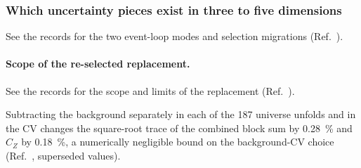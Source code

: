 \subsubsection{Which uncertainty pieces exist in three to five dimensions}
\label{sec:uq-higherdim}
See the records for the two event-loop modes and selection migrations (Ref.~\cite{NoteRecords2026}).

\paragraph{Scope of the re-selected replacement.} See the records for the scope and limits of the replacement (Ref.~\cite{NoteRecords2026}).

Subtracting the background separately in each of the 187 universe unfolds and in the CV changes the square-root trace of the combined block sum by \SI{0.28}{\percent} and $C_Z$ by \SI{0.18}{\percent}, a numerically negligible bound on the background-CV choice (Ref.~\cite{NoteRecords2026}, superseded values).

